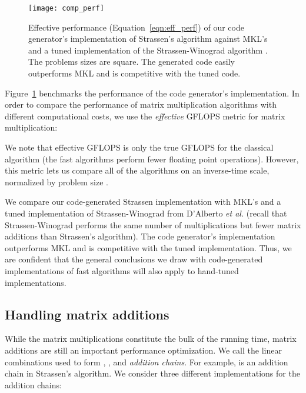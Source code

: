 \documentclass[preprint]{sigplanconf}
\begin{document}
\begin{figure}[tb]
\centering
\texttt{[image: comp\_perf]}
\caption{
Effective performance (Equation~\eqref{eqn:eff_perf}) of our code generator's implementation of Strassen's algorithm against MKL's  and a tuned implementation of the Strassen-Winograd algorithm \cite{d2011exploiting}.
The problems sizes are square.
The generated code easily outperforms MKL and is competitive with the tuned code.
}
\label{fig:comp_perf}
\end{figure}

Figure~\ref{fig:comp_perf} benchmarks the performance of the code generator's implementation.
In order to compare the performance of matrix multiplication algorithms with different computational costs,
we use the \emph{effective} GFLOPS metric for  matrix multiplication:

We note that effective GFLOPS is only the true GFLOPS for the classical algorithm
(the fast algorithms perform fewer floating point operations).
However, this metric lets us compare all of the algorithms on an inverse-time scale, normalized by problem size \cite{lipshitz2012communication}.

We compare our code-generated Strassen implementation with MKL's  and a tuned implementation of Strassen-Winograd from D'Alberto \emph{et al.} \cite{d2011exploiting} (recall that Strassen-Winograd performs the same number of multiplications but fewer matrix additions than Strassen's algorithm).
The code generator's implementation outperforms MKL and is competitive with the tuned implementation.
Thus, we are confident that the general conclusions we draw with code-generated implementations of fast algorithms will also apply to hand-tuned implementations.



\subsection{Handling matrix additions}
\label{sec:matrix_additions}

While the matrix multiplications constitute the bulk of the running time,
matrix additions are still an important performance optimization.
We call the linear combinations used to form , , and  \emph{addition chains}.
For example,  is an addition chain in Strassen's algorithm.
We consider three different implementations for the addition chains:
\end{document}
